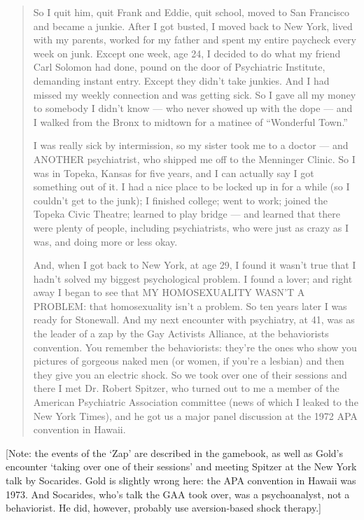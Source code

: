 \begin{refsection}
\begin{quote}
So I quit him, quit Frank and Eddie, quit school, moved to San Francisco and became a junkie. After I got busted, I moved back to New York, lived with my parents, worked for my father and spent my entire paycheck every week on junk. Except one week, age 24, I decided to do what my friend Carl Solomon had done, pound on the door of Psychiatric Institute, demanding instant entry. Except they didn't take junkies. And I had missed my weekly connection and was getting sick. So I gave all my money to somebody I didn't know — who never showed up with the dope — and I walked from the Bronx to midtown for a matinee of ``Wonderful Town.''

I was really sick by intermission, so my sister took me to a doctor — and ANOTHER psychiatrist, who shipped me off to the Menninger Clinic. So I was in Topeka, Kansas for five years, and I can actually say I got something out of it. I had a nice place to be locked up in for a while (so I couldn't get to the junk); I finished college; went to work; joined the Topeka Civic Theatre; learned to play bridge — and learned that there were plenty of people, including psychiatrists, who were just as crazy as I was, and doing more or less okay.

And, when I got back to New York, at age 29, I found it wasn’t true that I hadn’t solved my biggest psychological problem. I found a lover; and right away I began to see that MY HOMOSEXUALITY WASN’T A PROBLEM: that homosexuality isn’t a problem. So ten years later I was ready for Stonewall. And my next encounter with psychiatry, at 41, was as the leader of a zap by the Gay Activists Alliance, at the behaviorists convention. You remember the behaviorists: they’re the ones who show you pictures of gorgeous naked men (or women, if you’re a lesbian) and then they give you an electric shock.
So we took over one of their sessions and there I met Dr. Robert Spitzer, who turned out to me a member of the American Psychiatric Association committee (news of which I leaked to the New York Times), and he got us a major panel discussion at the 1972 APA convention in Hawaii.
\end{quote}

[Note: the events of the `Zap' are described in the gamebook, as well as Gold's encounter `taking over one of their sessions' and meeting Spitzer at the New York talk by Socarides. Gold is slightly wrong here: the APA convention in Hawaii was 1973. And Socarides, who's talk the GAA took over, was a psychoanalyst, not a behaviorist. He did, however, probably use aversion-based shock therapy.]


\end{refsection}
